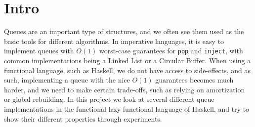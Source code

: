 \section{Intro}
Queues are an important type of structures, and we often see them used as the basic tools for different algorithms. In imperative languages, it is easy to implement queues with $O(1)$ worst-case guarantees for \texttt{pop} and \texttt{inject}, with common implementations being a Linked List or a Circular Buffer. When using a functional language, such as Haskell, we do not have access to side-effects, and as such, implementing a queue with the nice $O(1)$ guarantees becomes much harder, and we need to make certain trade-offs, such as relying on amortization or global rebuilding. In this project we look at several different queue implementations in the functional lazy functional language of Haskell, and try to show their different properties through experiments.